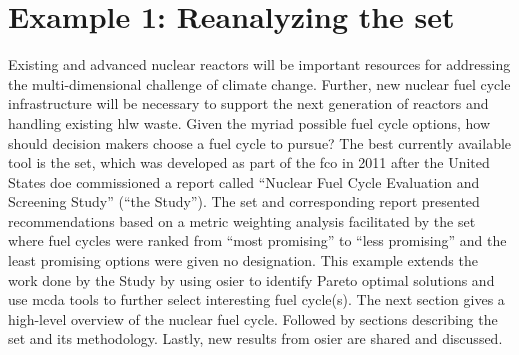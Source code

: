 
\section{Example 1: Reanalyzing the \acs{set}}

Existing and advanced nuclear reactors will be important resources for addressing the multi-dimensional challenge of climate change. Further,
new nuclear fuel cycle infrastructure will be necessary to support the next generation of reactors and handling existing \ac{hlw} waste. Given
the myriad possible fuel cycle options, how should decision makers choose a fuel cycle to pursue? The best currently available tool is the \acf{set},
which was developed as part of the \ac{fco} in 2011 after the United States \ac{doe} commissioned a report called ``Nuclear Fuel Cycle Evaluation and
Screening Study'' (``the Study'')\cite{wigeland_nuclear_2014-2}. The \ac{set} and corresponding report presented recommendations based on a metric weighting
analysis facilitated by the \ac{set} where fuel cycles were ranked from ``most promising'' to ``less promising'' and the least promising options were
given no designation. This example extends the work done by the Study by using \ac{osier} to identify Pareto optimal solutions and use \ac{mcda} tools
to further select interesting fuel cycle(s). The next section gives a high-level overview of the nuclear fuel cycle. Followed by sections describing the \ac{set}
and its methodology. Lastly, new results from \ac{osier} are shared and discussed.



